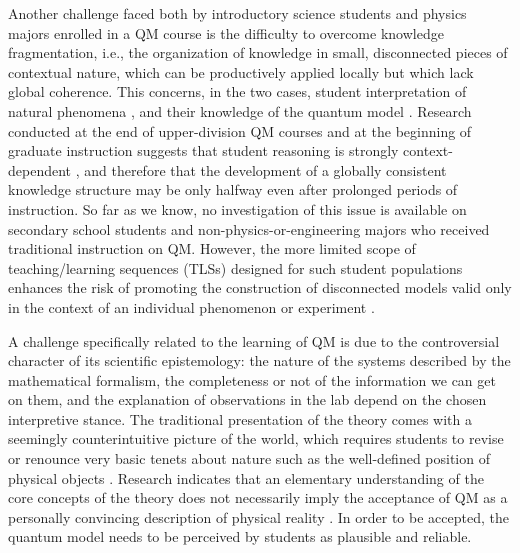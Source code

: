 \documentclass[twocolumn,secnumarabic,amssymb, nobibnotes, aps, prd, nofootinbib]{revtex4-2}
\begin{document}
Another challenge faced both by introductory science students and physics majors enrolled in a QM course is the difficulty to overcome knowledge fragmentation, i.e., the organization of knowledge in small, disconnected pieces of contextual nature, which can be productively applied locally but which lack global coherence. This concerns, in the two cases, student interpretation of natural phenomena \cite{Vosniadou2008, diSessa2014}, and their knowledge of the quantum model \cite{Johnston1998}. Research conducted at the end of upper-division QM courses and at the beginning of graduate instruction suggests that student reasoning is strongly context-dependent \cite{Marshman2015}, and therefore that the development of a globally consistent knowledge structure may be only halfway even after prolonged periods of instruction. So far as we know, no investigation of this issue is available on secondary school students and non-physics-or-engineering majors who received traditional instruction on QM. However, the more limited scope of teaching/learning sequences (TLSs) designed for such student populations enhances the risk of promoting the construction of disconnected models valid only in the context of an individual phenomenon or experiment \cite{Malgieri2017}.

A challenge specifically related to the learning of QM is due to the controversial character of its scientific epistemology: the nature of the systems described by the mathematical formalism, the completeness or not of the information we can get on them, and the explanation of observations in the lab depend on the chosen interpretive stance. The traditional presentation of the theory comes with a seemingly counterintuitive picture of the world, which requires students to revise or renounce very basic tenets about nature such as the well-defined position of physical objects \cite[e.g.,][]{Griffiths2018}. Research indicates that an elementary understanding of the core concepts of the theory does not necessarily imply the acceptance of QM as a personally convincing description of physical reality \cite{Ravaioli2017}. In order to be accepted, the quantum model needs to be perceived by students as plausible and reliable.
\end{document}
